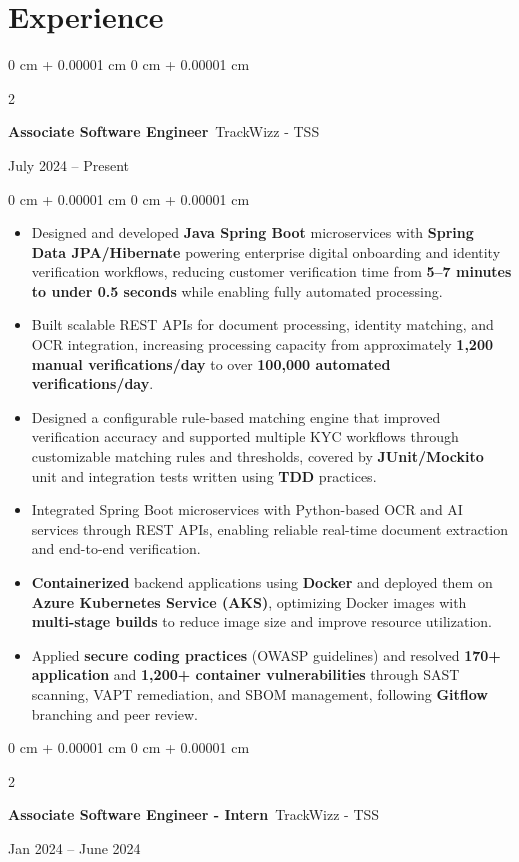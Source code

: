 \documentclass[10pt, letterpaper]{article}
\newenvironment{highlights}{
    \begin{itemize}[
        topsep=0.10 cm,
        parsep=0.10 cm,
        partopsep=0pt,
        itemsep=0pt,
        leftmargin=0 cm + 10pt
    ]
}{
    \end{itemize}
} %
\newenvironment{onecolentry}{
    \begin{adjustwidth}{
        0 cm + 0.00001 cm
    }{
        0 cm + 0.00001 cm
    }
}{
    \end{adjustwidth}
} %
\newenvironment{twocolentry}[2][]{
    \onecolentry
    \def\secondColumn{#2}
    \setcolumnwidth{\fill, 4.5 cm}
    \begin{paracol}{2}
}{
    \switchcolumn \raggedleft \secondColumn
    \end{paracol}
    \endonecolentry
} %
\begin{document}
    \section{Experience}
        \begin{twocolentry}{July 2024 – Present}
            \textbf{Associate Software Engineer}\, TrackWizz - TSS
        \end{twocolentry}
        \vspace{0.10 cm}
        \begin{onecolentry}
            \begin{highlights}

            \item Designed and developed \textbf{Java Spring Boot} microservices with \textbf{Spring Data JPA/Hibernate} powering enterprise digital onboarding and identity verification workflows, reducing customer verification time from \textbf{5--7 minutes to under 0.5 seconds} while enabling fully automated processing.

            \item Built scalable REST APIs for document processing, identity matching, and OCR integration, increasing processing capacity from approximately \textbf{1,200 manual verifications/day} to over \textbf{100,000 automated verifications/day}.

            \item Designed a configurable rule-based matching engine that improved verification accuracy and supported multiple KYC workflows through customizable matching rules and thresholds, covered by \textbf{JUnit/Mockito} unit and integration tests written using \textbf{TDD} practices.
            
            \item Integrated Spring Boot microservices with Python-based OCR and AI services through REST APIs, enabling reliable real-time document extraction and end-to-end verification.
            
            \item \textbf{Containerized} backend applications using \textbf{Docker} and deployed them on \textbf{Azure Kubernetes Service (AKS)}, optimizing Docker images with \textbf{multi-stage builds} to reduce image size and improve resource utilization.
            
            \item Applied \textbf{secure coding practices} (OWASP guidelines) and resolved \textbf{170+ application} and \textbf{1,200+ container vulnerabilities} through SAST scanning, VAPT remediation, and SBOM management, following \textbf{Gitflow} branching and peer review.
            \end{highlights}

            \vspace{0.2 cm}
            
            \begin{twocolentry}{Jan 2024 -- June 2024}
                \textbf{Associate Software Engineer - Intern}\, TrackWizz - TSS
            \end{twocolentry}
            \vspace{0.10 cm}
            \end{onecolentry}
            
\end{document}

